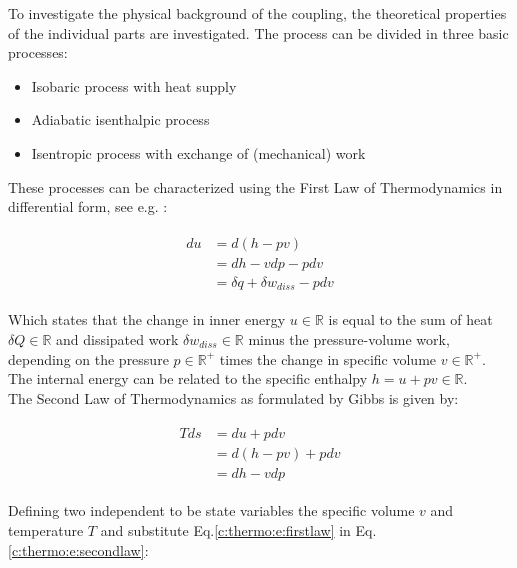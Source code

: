 To investigate the physical background of the coupling, the theoretical properties of the individual parts are investigated. The process can be divided in three basic processes:

\begin{itemize}
\item Isobaric process with heat supply
\item Adiabatic isenthalpic process 
\item Isentropic process with exchange of (mechanical) work
\end{itemize}

These processes can be characterized using the First Law of Thermodynamics in differential form, see e.g. \cite[p.25]{Weigand2013}:

\begin{align}
\begin{split}
du &= d \left( h - pv \right ) \\ &= dh - v dp - p dv \\
&= \delta q + \delta w_{diss} - p dv
\end{split}
\label{c:thermo:e:firstlaw}
\end{align}

Which states that the change in inner energy $u \in \mathbb{R}$ is equal to the sum of heat $\delta Q \in \mathbb{R}$ and dissipated work $\delta w_{diss} \in \mathbb{R}$ minus the pressure-volume work, depending on the pressure $p \in \mathbb{R}^+$ times the change in specific volume $v \in \mathbb{R}^+$. The internal energy can be related to the specific enthalpy $h = u +pv \in \mathbb{R}$.\\

The Second Law of Thermodynamics as formulated by Gibbs \cite[p.59]{Struchtrup2014} is given by:

\begin{align}
\begin{split}
T ds &= du + p dv \\
 &= d( h - pv ) + p dv \\
 &= dh - vdp
\end{split}
\label{c:thermo:e:secondlaw}
\end{align}

Defining two independent to be state variables the specific volume $v$ and temperature $T$ and substitute Eq.\ref{c:thermo:e:firstlaw} in Eq.\ref{c:thermo:e:secondlaw}:

